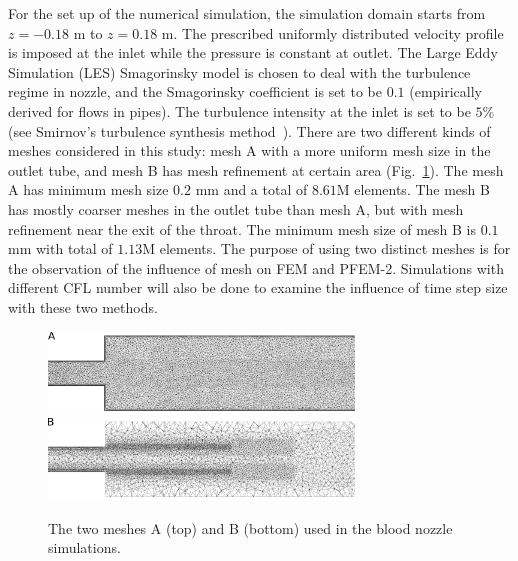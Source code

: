 For the set up of the numerical simulation, the simulation domain starts from $z=-0.18$ m to $z=0.18$ m. The prescribed uniformly distributed velocity profile is imposed at the inlet while the pressure is constant at outlet. The Large Eddy Simulation (LES) Smagorinsky model is chosen to deal with the turbulence regime in nozzle, and the Smagorinsky coefficient is set to be $0.1$ (empirically derived for flows in pipes). The turbulence intensity at the inlet is set to be $5$\% (see Smirnov's turbulence synthesis method~\cite{Smirnov2001}). There are two different kinds of meshes considered in this study: mesh A with a more uniform mesh size in the outlet tube, and mesh B has mesh refinement at certain area (Fig.~\ref{fig:nozzlemesh}). The mesh A has minimum mesh size $0.2$ mm and a total of $8.61$M elements. The mesh B has mostly coarser meshes in the outlet tube than mesh A, but with mesh refinement near the exit of the throat. The minimum mesh size of mesh B is $0.1$ mm with total of $1.13$M elements. The purpose of using two distinct meshes is for the observation of the influence of mesh on FEM and PFEM-2. Simulations with different CFL number will also be done to examine the influence of time step size with these two methods.

\begin{figure}[htbp]
    \centering
    \includegraphics[width=3.2in]{imgs/nozzle_pump/nozzle_fmesh_2.pdf}
    \includegraphics[width=3.2in]{imgs/nozzle_pump/nozzle_pmesh_2.pdf}
    \caption{The two meshes A (top) and B (bottom) used in the blood nozzle simulations.}
    \label{fig:nozzlemesh}
\end{figure}


